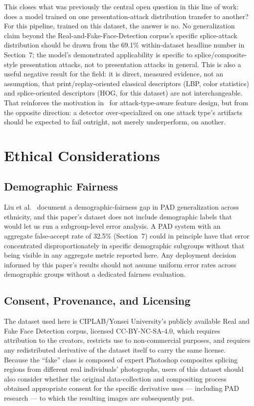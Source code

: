 \documentclass[11pt]{article}
\begin{document}
This closes what was previously the central open question in this line of work: does a model trained on one presentation-attack distribution transfer to another? For this pipeline, trained on this dataset, the answer is no. No generalization claim beyond the Real-and-Fake-Face-Detection corpus's specific splice-attack distribution should be drawn from the 69.1\% within-dataset headline number in Section~7; the model's demonstrated applicability is specific to splice/composite-style presentation attacks, not to presentation attacks in general. This is also a useful negative result for the field: it is direct, measured evidence, not an assumption, that print/replay-oriented classical descriptors (LBP, color statistics) and splice-oriented descriptors (HOG, for this dataset) are not interchangeable. That reinforces the motivation in~\cite{boulkenafet2015,boulkenafet2016} for attack-type-aware feature design, but from the opposite direction: a detector over-specialized on one attack type's artifacts should be expected to fail outright, not merely underperform, on another.

\section{Ethical Considerations}

\subsection{Demographic Fairness}

Liu et al.~\cite{liu2021} document a demographic-fairness gap in PAD generalization across ethnicity, and this paper's dataset does not include demographic labels that would let us run a subgroup-level error analysis. A PAD system with an aggregate false-accept rate of 32.5\% (Section~7) could in principle have that error concentrated disproportionately in specific demographic subgroups without that being visible in any aggregate metric reported here. Any deployment decision informed by this paper's results should not assume uniform error rates across demographic groups without a dedicated fairness evaluation.

\subsection{Consent, Provenance, and Licensing}

The dataset used here is CIPLAB/Yonsei University's publicly available Real and Fake Face Detection corpus, licensed CC-BY-NC-SA-4.0, which requires attribution to the creators, restricts use to non-commercial purposes, and requires any redistributed derivative of the dataset itself to carry the same license. Because the ``fake'' class is composed of expert Photoshop composites splicing regions from different real individuals' photographs, users of this dataset should also consider whether the original data-collection and compositing process obtained appropriate consent for the specific derivative uses --- including PAD research --- to which the resulting images are subsequently put.
\end{document}
